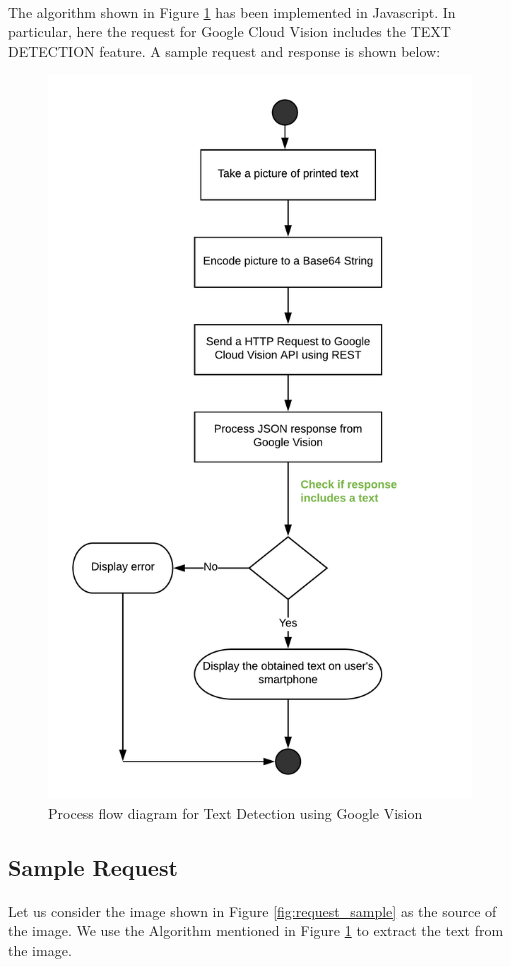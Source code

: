 \documentclass[12pt]{article}
\begin{document}
\paragraph{}The algorithm shown in Figure \ref{fig:vision} has been implemented in Javascript. In particular, here the request for Google Cloud Vision includes the TEXT DETECTION feature. A sample request and response is shown below:

\begin{figure}[H]
	\centering
	\includegraphics[width=0.75\linewidth]{media/VISION_API.png}
	\caption{Process flow diagram for Text Detection using Google Vision}
	\label{fig:vision}
\end{figure} 

\subsection{Sample Request}

\paragraph{}Let us consider the image shown in Figure \ref{fig:request_sample} as the source of the image. We use the Algorithm mentioned in Figure \ref{fig:vision} to extract the text from the image.
\end{document}
